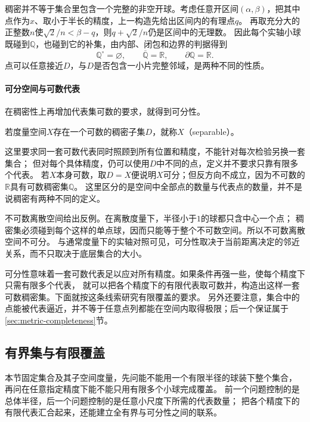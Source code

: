 稠密并不等于集合里包含一个完整的非空开球。考虑任意开区间$(\alpha,\beta)$，把其中点作为$x$、取小于半长的精度，上一构造先给出区间内的有理点$q$。
再取充分大的正整数$n$使$\sqrt2/n<\beta-q$，则$q+\sqrt2/n$仍是区间中的无理数。
因此每个实轴小球既碰到$\mathbb Q$，也碰到它的补集，由内部、闭包和边界的判据得到
\[
  \mathbb Q^\circ=\varnothing,\qquad \overline{\mathbb Q}=\mathbb R,\qquad \partial\mathbb Q=\mathbb R.
\]
点可以任意接近$D$，与$D$是否包含一小片完整邻域，是两种不同的性质。

\paragraph{可分空间与可数代表}

在稠密性上再增加代表集可数的要求，就得到可分性。

\begin{definition}[可分空间]
\label{def:metric-separable}
若度量空间$X$存在一个可数的稠密子集$D$，就称$X$（separable）。
\end{definition}

这里要求同一套可数代表同时照顾到所有位置和精度，不能针对每次检验另换一套集合；
但对每个具体精度，仍可以使用$D$中不同的点，定义并不要求只靠有限多个代表。
若$X$本身可数，取$D=X$便说明$X$可分；但反方向不成立，因为不可数的$\mathbb R$具有可数稠密集$\mathbb Q$。
这里区分的是空间中全部点的数量与代表点的数量，并不是说稠密有两种不同的定义。

不可数离散空间给出反例。在离散度量下，半径小于$1$的球都只含中心一个点；
稠密集必须碰到每个这样的单点球，因而只能等于整个不可数空间。所以不可数离散空间不可分。
与通常度量下的实轴对照可见，可分性取决于当前距离决定的邻近关系，而不只取决于底层集合的大小。

可分性意味着一套可数代表足以应对所有精度。如果条件再强一些，使每个精度下只需有限多个代表，
就可以把各个精度下的有限代表取可数并，构造出这样一套可数稠密集。下面就按这条线索研究有限覆盖的要求。
另外还要注意，集合中的点能被代表逼近，并不等于任意点列都能在空间内取得极限；后一个保证属于\ref{sec:metric-completeness}节。

\subsection{有界集与有限覆盖}
\label{sec:metric-covering-budgets}

本节固定集合及其子空间度量，先问能不能用一个有限半径的球装下整个集合，
再问在任意指定精度下能不能只用有限多个小球完成覆盖。
前一个问题控制的是总体半径，后一个问题控制的是任意小尺度下所需的代表数量；
把各个精度下的有限代表汇合起来，还能建立全有界与可分性之间的联系。

